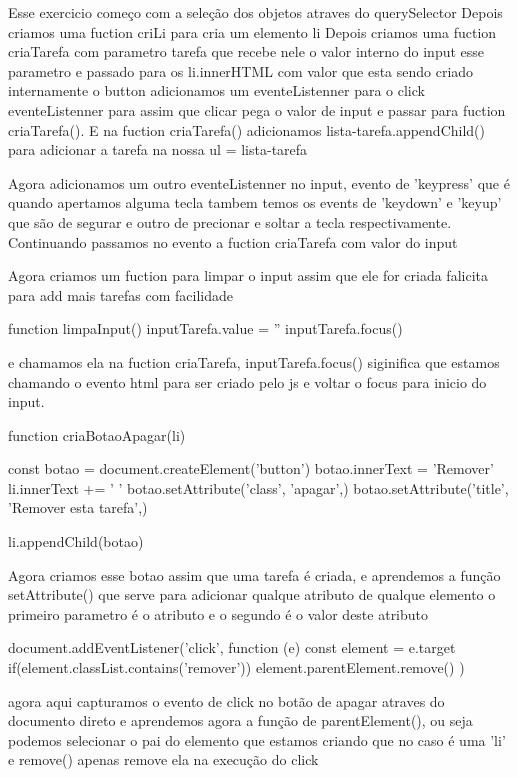 Esse exercicio começo com a seleção dos objetos atraves do querySelector 
Depois criamos uma fuction criLi para cria um elemento li 
Depois criamos uma fuction criaTarefa com parametro tarefa que recebe nele o valor interno
do input esse parametro e passado para os li.innerHTML com valor que esta sendo criado internamente
o button adicionamos um eventeListenner para o click eventeListenner para assim que clicar 
pega o valor de input e passar para fuction criaTarefa(). E na fuction criaTarefa() adicionamos
lista-tarefa.appendChild() para adicionar a tarefa na nossa ul = lista-tarefa



Agora adicionamos um outro eventeListenner no input, evento de 'keypress' que é quando 
apertamos alguma tecla tambem temos os events de 'keydown' e 'keyup' que são de segurar
e outro de precionar e soltar a tecla respectivamente. Continuando passamos no evento a 
fuction criaTarefa com valor do input 

Agora criamos um fuction para limpar o input assim que ele for criada falicita para add
mais tarefas com facilidade

function limpaInput(){
    inputTarefa.value = ''
    inputTarefa.focus()
}

e chamamos ela na fuction criaTarefa, inputTarefa.focus() siginifica que estamos chamando 
o evento html para ser criado pelo js e voltar o focus para inicio do input. 


function criaBotaoApagar(li){
    const botao = document.createElement('button')
    botao.innerText = 'Remover'
    li.innerText += ' '
    botao.setAttribute('class', 'apagar',)
    botao.setAttribute('title', 'Remover esta tarefa',)

    li.appendChild(botao)
}

Agora criamos esse botao assim que uma tarefa é criada, e aprendemos a função setAttribute() que serve 
para adicionar qualque atributo de qualque elemento o primeiro parametro é o atributo e o segundo é o valor
deste atributo

document.addEventListener('click', function (e){
    const element = e.target
    if(element.classList.contains('remover')){
      element.parentElement.remove()
    }
})

agora aqui capturamos o evento de click no botão de apagar atraves do documento direto e aprendemos agora 
a função de parentElement(), ou seja podemos selecionar o pai do elemento que estamos criando que no caso é 
uma 'li' e remove() apenas remove ela na execução do click

